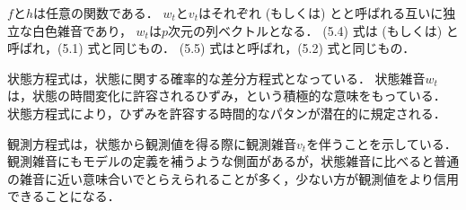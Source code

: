 \documentclass[11pt,a4paper]{jsarticle}
\numberwithin{equation}{section}
\begin{document}
$f$と$h$は任意の関数である．
$w_t$と$v_t$はそれぞれ (もしくは) とと呼ばれる互いに独立な白色雑音であり，
$w_t$は$p$次元の列ベクトルとなる．
(5.4) 式は (もしくは) と呼ばれ，(5.1) 式と同じもの．
(5.5) 式はと呼ばれ，(5.2) 式と同じもの．

状態方程式は，状態に関する確率的な差分方程式となっている．
状態雑音$w_t$は，状態の時間変化に許容されるひずみ，という積極的な意味をもっている．
状態方程式により，ひずみを許容する時間的なパタンが潜在的に規定される．

観測方程式は，状態から観測値を得る際に観測雑音$v_t$を伴うことを示している．
観測雑音にもモデルの定義を補うような側面があるが，状態雑音に比べると普通の雑音に近い意味合いでとらえられることが多く，少ない方が観測値をより信用できることになる．
\end{document}
